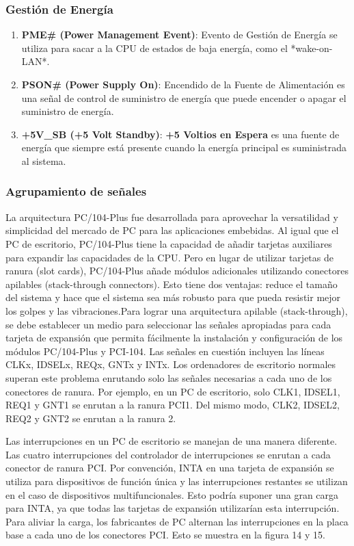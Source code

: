 \documentclass[12pt]{article}
\begin{document}
	\subsubsection*{Gestión de Energía}
	\begin{enumerate}
		\item \textbf{PME\# (Power Management Event)}: Evento de Gestión de Energía se utiliza para sacar a la CPU de estados de baja energía, como el *wake-on-LAN*.
		
		\item \textbf{PSON\# (Power Supply On)}: Encendido de la Fuente de Alimentación es una señal de control de suministro de energía que puede encender o apagar el suministro de energía.
		
		\item \textbf{+5V\_SB (+5 Volt Standby)}: \textbf{+5 Voltios en Espera} es una fuente de energía que siempre está presente cuando la energía principal es suministrada al sistema.
	\end{enumerate}
	
	\subsubsection*{Agrupamiento de señales}
	La arquitectura PC/104-Plus fue desarrollada para aprovechar la versatilidad y simplicidad del mercado de PC para las aplicaciones embebidas. Al igual que el PC de escritorio, PC/104-Plus tiene la capacidad de añadir tarjetas auxiliares para expandir las capacidades de la CPU. Pero en lugar de utilizar tarjetas de ranura (slot cards), PC/104-Plus añade módulos adicionales utilizando conectores apilables (stack-through connectors). Esto tiene dos ventajas: reduce el tamaño del sistema y hace que el sistema sea más robusto para que pueda resistir mejor los golpes y las vibraciones.Para lograr una arquitectura apilable (stack-through), se debe establecer un medio para seleccionar las señales apropiadas para cada tarjeta de expansión que permita fácilmente la instalación y configuración de los módulos PC/104-Plus y PCI-104. Las señales en cuestión incluyen las líneas CLKx, IDSELx, REQx, GNTx y INTx. Los ordenadores de escritorio normales superan este problema enrutando solo las señales necesarias a cada uno de los conectores de ranura. Por ejemplo, en un PC de escritorio, solo CLK1, IDSEL1, REQ1 y GNT1 se enrutan a la ranura PCI1. Del mismo modo, CLK2, IDSEL2, REQ2 y GNT2 se enrutan a la ranura 2.
	
	Las interrupciones en un PC de escritorio se manejan de una manera diferente. Las cuatro interrupciones del controlador de interrupciones se enrutan a cada conector de ranura PCI. Por convención, INTA en una tarjeta de expansión se utiliza para dispositivos de función única y las interrupciones restantes se utilizan en el caso de dispositivos multifuncionales. Esto podría suponer una gran carga para INTA, ya que todas las tarjetas de expansión utilizarían esta interrupción. Para aliviar la carga, los fabricantes de PC alternan las interrupciones en la placa base a cada uno de los conectores PCI. Esto se muestra en la figura 14 y 15.
	
\end{document}
